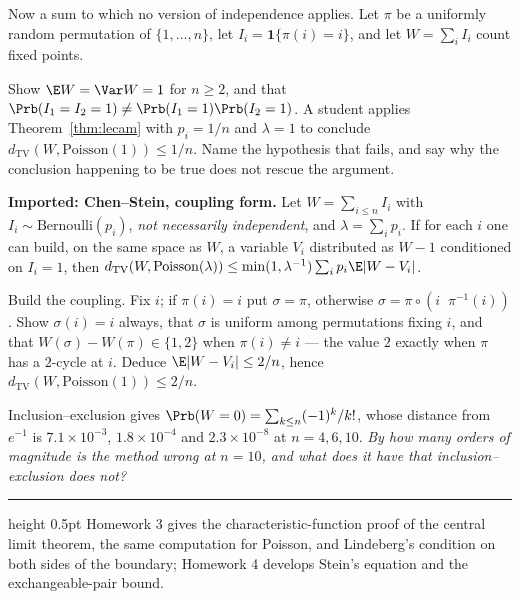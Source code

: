 \documentclass[11pt]{article}
\newcommand{\Poi}{\mathrm{Poisson}}
\newcommand{\Ber}{\mathrm{Bernoulli}}
\newcommand{\TV}{d_{\mathrm{TV}}}
\begin{document}
Now a sum to which no version of independence applies. Let $\pi$ be a uniformly random permutation of $\{1,\dots,n\}$, let $I_i=\mathbf 1\{\pi(i)=i\}$, and let $W=\sum_iI_i$ count fixed points.

\begin{exercise}[\ty{A}]
Show $\E W=\Var W=1$ for $n\ge2$, and that $\Prb(I_1=I_2=1)\ne\Prb(I_1=1)\Prb(I_2=1)$. A student applies Theorem~\ref{thm:lecam} with $p_i=1/n$ and $\lambda=1$ to conclude $\TV(W,\Poi(1))\le1/n$. Name the hypothesis that fails, and say why the conclusion happening to be true does not rescue the argument.
\end{exercise}

\begin{imported}
\textbf{Imported: Chen--Stein, coupling form.} Let $W=\sum_{i\le n}I_i$ with $I_i\sim\Ber(p_i)$, \emph{not necessarily independent}, and $\lambda=\sum_ip_i$. If for each $i$ one can build, on the same space as $W$, a variable $V_i$ distributed as $W-1$ conditioned on $I_i=1$, then $\TV(W,\Poi(\lambda))\le\min(1,\lambda^{-1})\sum_ip_i\E|W-V_i|$.
\end{imported}

\begin{exercise}[\ty{C}]
Build the coupling. Fix $i$; if $\pi(i)=i$ put $\sigma=\pi$, otherwise $\sigma=\pi\circ(i\;\;\pi^{-1}(i))$. Show $\sigma(i)=i$ always, that $\sigma$ is uniform among permutations fixing $i$, and that $W(\sigma)-W(\pi)\in\{1,2\}$ when $\pi(i)\ne i$ --- the value $2$ exactly when $\pi$ has a $2$-cycle at $i$. Deduce $\E|W-V_i|\le2/n$, hence $\TV(W,\Poi(1))\le2/n$.

Inclusion--exclusion gives $\Prb(W=0)=\sum_{k\le n}(-1)^k/k!$, whose distance from $e^{-1}$ is $7.1\times10^{-3}$, $1.8\times10^{-4}$ and $2.3\times10^{-8}$ at $n=4,6,10$. \emph{By how many orders of magnitude is the method wrong at $n=10$, and what does it have that inclusion--exclusion does not?}
\end{exercise}

\vspace{1em}
\hrule height 0.5pt
\vspace{0.4em}
{\footnotesize\color{grey} Homework 3 gives the characteristic-function proof of the central limit theorem, the same computation for Poisson, and Lindeberg's condition on both sides of the boundary; Homework 4 develops Stein's equation and the exchangeable-pair bound.}
\end{document}
